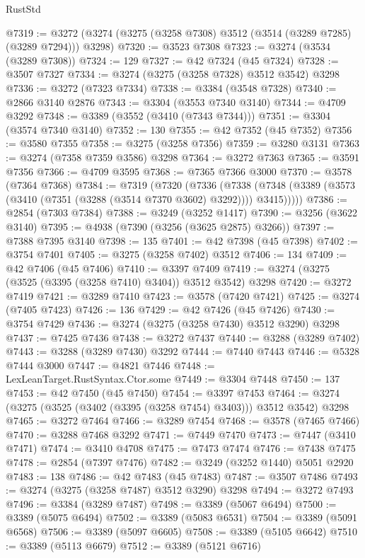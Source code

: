 \begin{lexlean}{RustStd}
\begin{coremodule}
@7319 := @3272 (@3274 (@3275 (@3258 @7308) @3512 (@3514 (@3289 @7285) (@3289 @7294))) @3298)
@7320 := @3523 @7308
@7323 := @3274 (@3534 (@3289 @7308))
@7324 := 129
@7327 := @42 @7324 (@45 @7324)
@7328 := @3507 @7327
@7334 := @3274 (@3275 (@3258 @7328) @3512 @3542) @3298
@7336 := @3272 (@7323 @7334)
@7338 := @3384 (@3548 @7328)
@7340 := @2866 @3140 @2876
@7343 := @3304 (@3553 @7340 @3140)
@7344 := @4709 @3292
@7348 := @3389 (@3552 (@3410 (@7343 @7344)))
@7351 := @3304 (@3574 @7340 @3140)
@7352 := 130
@7355 := @42 @7352 (@45 @7352)
@7356 := @3580 @7355
@7358 := @3275 (@3258 @7356)
@7359 := @3280 @3131
@7363 := @3274 (@7358 @7359 @3586) @3298
@7364 := @3272 @7363
@7365 := @3591 @7356
@7366 := @4709 @3595
@7368 := @7365 @7366 @3000
@7370 := @3578 (@7364 @7368)
@7384 := @7319
    (@7320
      (@7336
        (@7338 (@7348 (@3389 (@3573 (@3410 (@7351 (@3288 (@3514 @7370 @3602) @3292)))) @3415)))))
@7386 := @2854 (@7303 @7384)
@7388 := @3249 (@3252 @1417)
@7390 := @3256 (@3622 @3140)
@7395 := @4938 (@7390 (@3256 (@3625 @2875) @3266))
@7397 := @7388 @7395 @3140
@7398 := 135
@7401 := @42 @7398 (@45 @7398)
@7402 := @3754 @7401
@7405 := @3275 (@3258 @7402) @3512
@7406 := 134
@7409 := @42 @7406 (@45 @7406)
@7410 := @3397 @7409
@7419 := @3274 (@3275 (@3525 (@3395 (@3258 @7410) @3404)) @3512 @3542) @3298
@7420 := @3272 @7419
@7421 := @3289 @7410
@7423 := @3578 (@7420 @7421)
@7425 := @3274 (@7405 @7423)
@7426 := 136
@7429 := @42 @7426 (@45 @7426)
@7430 := @3754 @7429
@7436 := @3274 (@3275 (@3258 @7430) @3512 @3290) @3298
@7437 := @7425 @7436
@7438 := @3272 @7437
@7440 := @3288 (@3289 @7402)
@7443 := @3288 (@3289 @7430) @3292
@7444 := @7440 @7443
@7446 := @5328 @7444 @3000
@7447 := @4821 @7446
@7448 := LexLeanTarget.RustSyntax.Ctor.some
@7449 := @3304 @7448
@7450 := 137
@7453 := @42 @7450 (@45 @7450)
@7454 := @3397 @7453
@7464 := @3274 (@3275 (@3525 (@3402 (@3395 (@3258 @7454) @3403))) @3512 @3542) @3298
@7465 := @3272 @7464
@7466 := @3289 @7454
@7468 := @3578 (@7465 @7466)
@7470 := @3288 @7468 @3292
@7471 := @7449 @7470
@7473 := @7447 (@3410 @7471)
@7474 := @3410 @4708
@7475 := @7473 @7474
@7476 := @7438 @7475
@7478 := @2854 (@7397 @7476)
@7482 := @3249 (@3252 @1440) @5051 @2920
@7483 := 138
@7486 := @42 @7483 (@45 @7483)
@7487 := @3507 @7486
@7493 := @3274 (@3275 (@3258 @7487) @3512 @3290) @3298
@7494 := @3272 @7493
@7496 := @3384 (@3289 @7487)
@7498 := @3389 (@5067 @6494)
@7500 := @3389 (@5075 @6494)
@7502 := @3389 (@5083 @6531)
@7504 := @3389 (@5091 @6568)
@7506 := @3389 (@5097 @6605)
@7508 := @3389 (@5105 @6642)
@7510 := @3389 (@5113 @6679)
@7512 := @3389 (@5121 @6716)

\end{coremodule}
\end{lexlean}
